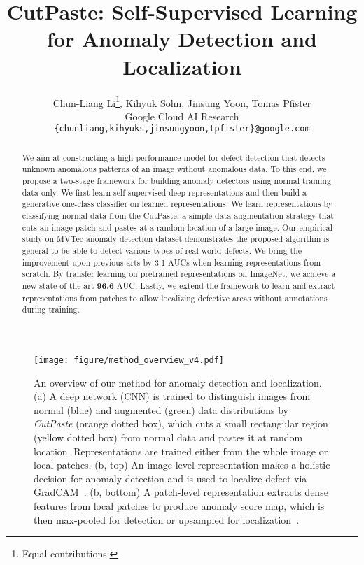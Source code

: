 \documentclass[final]{cvpr}
\begin{document}
\title{CutPaste: Self-Supervised Learning for Anomaly Detection and Localization}

\author{Chun-Liang Li\thanks{Equal contributions.}, Kihyuk Sohn\textsuperscript{\textasteriskcentered}, Jinsung Yoon, Tomas Pfister\\
Google Cloud AI Research\\
{\tt\small \{chunliang,kihyuks,jinsungyoon,tpfister\}@google.com}
}

\maketitle


\begin{abstract}
We aim at constructing a high performance model for defect detection that detects unknown anomalous patterns of an image without anomalous data. 
To this end, we propose a two-stage framework for building anomaly detectors using normal training data only. We first learn self-supervised deep representations and then build a generative one-class classifier on learned representations. We learn representations by classifying normal data from the CutPaste, a simple data augmentation strategy that cuts an image patch and pastes at a random location of a large image. 
Our empirical study on MVTec anomaly detection dataset demonstrates the proposed algorithm is general to be able to detect various types of real-world defects. We bring the
improvement upon previous arts by 3.1 AUCs when learning representations from scratch. By transfer learning on pretrained representations on ImageNet, we achieve a new state-of-the-art \textbf{96.6} AUC.
Lastly, we extend the framework to learn and extract representations from patches to allow localizing defective areas without annotations during training.

\end{abstract}
\begin{figure*}[t]
    \centering
    \texttt{[image: figure/method\_overview\_v4.pdf]}
    \vspace{-0.1in}
    \caption{An overview of our method for anomaly detection and localization. (a) A deep network (CNN) is trained to distinguish images from normal (blue) and augmented (green) data distributions by \emph{CutPaste} (orange dotted box), which cuts a small rectangular region (yellow dotted box) from normal data and pastes it at random location. Representations are trained either from the whole image or local patches. (b, top) An image-level representation makes a holistic decision for anomaly detection and is used to localize defect via GradCAM~\cite{selvaraju2017grad}. (b, bottom) A patch-level representation extracts dense features from local patches to produce anomaly score map, which is then max-pooled for detection or upsampled for localization~\cite{liznerski2020explainable}.}
    \label{fig:method_overview}
    \vspace{-0.2in}
\end{figure*}
\end{document}
